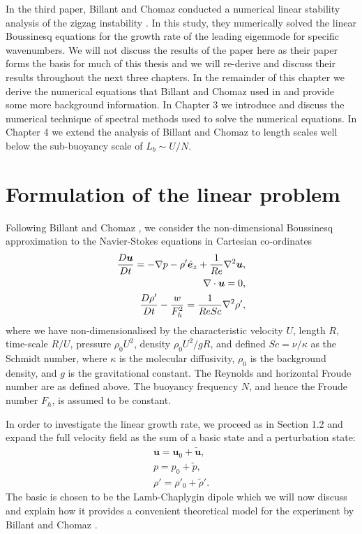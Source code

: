 In the third paper, Billant and Chomaz conducted a numerical linear stability analysis of the zigzag instability \cite{bc2000c}. In this study, they numerically solved the linear Boussinesq equations for the growth rate of the leading eigenmode for specific wavenumbers. We will not discuss the results of the paper here as their paper forms the basis for much of this thesis and we will re-derive and discuss their results throughout the next three chapters. In the remainder of this chapter we derive the numerical equations that Billant and Chomaz used in \cite{bc2000c} and provide some more background information. In Chapter 3 we introduce and discuss the numerical technique of spectral methods used to solve the numerical equations. In Chapter 4 we extend the analysis of Billant and Chomaz to length scales well below the sub-buoyancy scale of $L_{b}\sim U/N$. 

\section{Formulation of the linear problem}
Following Billant and Chomaz \cite{bc2000c}, we consider the non-dimensional Boussinesq approximation to the Navier-Stokes equations in Cartesian co-ordinates 
\begin{align}
\frac{D\bm{u}}{Dt} = -\nabla p - \rho'\hat{\bm{e}}_{z} + \frac{1}{Re}\nabla^{2} \bm{u},\label{bs_1}\\
\nabla \cdot \bm{u}=0,\label{bs_{2}}\\
\frac{D\rho'}{Dt} -\frac{w}{F_{h}^{2}} = \frac{1}{ReSc}\nabla^{2} \rho',\label{bs_3}
\end{align}
where we have non-dimensionalised by the characteristic velocity $U$, length $R$, time-scale $R/U$, pressure $\rho_{0}U^{2}$, density $\rho_{0}U^{2}/gR$, and defined $Sc=\nu /\kappa$ as the Schmidt number, where $\kappa$ is the molecular diffusivity, $\rho_{0}$ is the background density, and $g$ is the gravitational constant. The Reynolds and horizontal Froude number are as defined above. The buoyancy frequency $N$, and hence the Froude number $F_{h}$, is assumed to be constant. 

In order to investigate the linear growth rate, we proceed as in Section 1.2 and expand the full velocity field as the sum of a basic state and a perturbation state:
\begin{align}
\bm{u} = \bm{u}_{0} + \tilde{\bm{u}},\\
p = p_{0} + \tilde{p},\\
\rho' = \rho'_{0} + \tilde{\rho}'.
\end{align}
The basic is chosen to be the Lamb-Chaplygin dipole which we will now discuss and explain how it provides a convenient theoretical model for the experiment by Billant and Chomaz \cite{bc2000a}.


